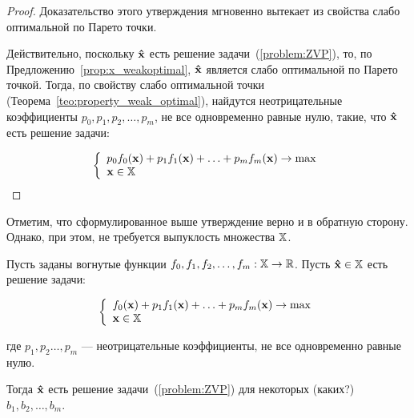 \begin{proof}
Доказательство этого утверждения мгновенно вытекает из свойства
слабо оптимальной по Парето точки.

Действительно, поскольку $\mathbf{\hat x}$ есть решение
задачи~(\ref{problem:ZVP}), то, по
Предложению~\ref{prop:x_weakoptimal}, $\mathbf{\hat x}$ является слабо
оптимальной по Парето точкой. Тогда, по свойству слабо оптимальной
точки (Теорема~\ref{teo:property_weak_optimal}), найдутся
неотрицательные коэффициенты $p_0, p_1, p_2, \ldots, p_m$, не все
одновременно равные нулю, такие, что $\mathbf{\hat x}$ есть решение
задачи:

\[
\left\{ \begin{array}{l}
 p_0 f_0(\mathbf{x}) + p_1 f_1(\mathbf{x})+ \ldots + p_m f_m(\mathbf{x}) \to \max  \\
 \mathbf{x} \in \mathbb{X} \\
 \end{array} \right.
\]

\end{proof}

Отметим, что сформулированное выше утверждение верно и в обратную
сторону. Однако, при этом, не требуется выпуклость множества
$\mathbb{X}$.

\begin{prop}\label{prop:sufficiency_TKT}

Пусть заданы вогнутые функции $f_0, f_1, f_2, \ldots, f_m: \mathbb{X}
\to \mathbb{R}$. Пусть ${\mathbf{\hat x} \in \mathbb{X}}$ есть решение задачи:

\[
\left\{ \begin{array}{l}
 f_0(\mathbf{x}) + p_1 f_1(\mathbf{x})+ \ldots + p_m f_m(\mathbf{x}) \to \max  \\
 \mathbf{x} \in \mathbb{X} \\
 \end{array} \right.
\]

\noindent где $p_1,p_2 \ldots, p_m$ --- неотрицательные
коэффициенты, не все одновременно равные нулю.

Тогда $\mathbf{\hat x}$ есть решение задачи~(\ref{problem:ZVP}) для
некоторых (каких?) $b_1, b_2, \ldots, b_m$.

\end{prop}

